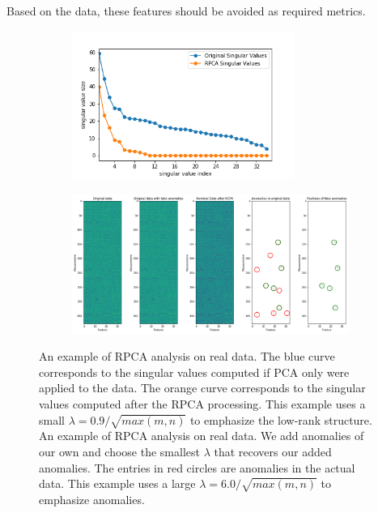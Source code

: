 \documentclass[conference]{IEEEtran}
\begin{document}
Based on the data, these features should be avoided as required metrics.



\begin{figure}
\begin{subfigure}{.5\textwidth}
    \centering
    \includegraphics[width=0.8\textwidth]{images/new_7-26-2020/real_data_svd.png}
    \label{fig:real_data_rank}
\end{subfigure}
\begin{subfigure}{.5\textwidth}
    \centering
    \includegraphics[width=1.0\textwidth]{images/new_7-26-2020/real_data.png}
    \label{fig:real_data_anomalie}
\end{subfigure}
    \caption{An example of RPCA analysis on real data.  The blue curve corresponds to the singular values computed if PCA only were applied to the data.  The orange curve corresponds to the singular values computed after the RPCA processing.  This example uses a small $\lambda=0.9/\sqrt{max(m,n)}$ to emphasize the low-rank structure. An example of RPCA analysis on real data.   We add anomalies of our own and choose the smallest $\lambda$ that recovers our added anomalies.  The entries in red circles are anomalies in the actual data. This example uses a large $\lambda=6.0/\sqrt{max(m,n)}$ to emphasize anomalies. }
    \label{fig:real_data}
\end{figure}
\end{document}
